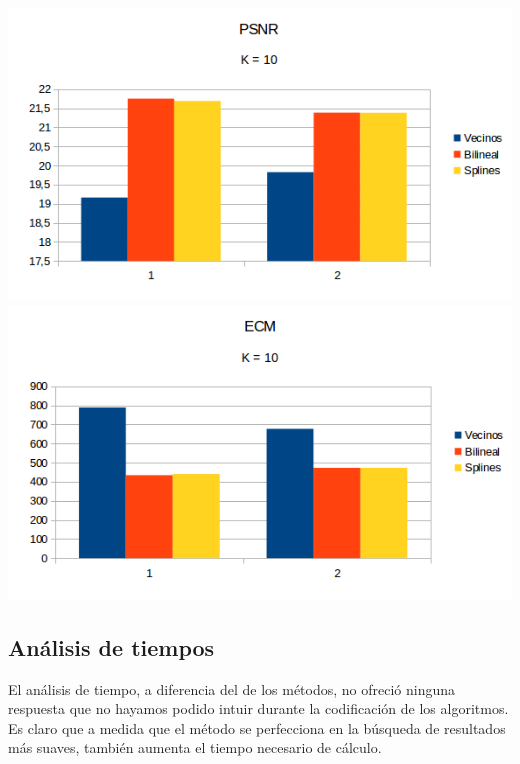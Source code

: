 \begin{center}
\includegraphics[scale=0.50]{imagenes/K10PSNR.png}
\includegraphics[scale=0.50]{imagenes/K10ECM.png}
\end{center}

\subsection{Análisis de tiempos}
El análisis de tiempo, a diferencia del de los métodos, no ofreció ninguna respuesta que no hayamos podido intuir durante la codificación de los algoritmos. Es claro que a medida que el método se perfecciona en la búsqueda de resultados más suaves, también aumenta el tiempo necesario de cálculo.

